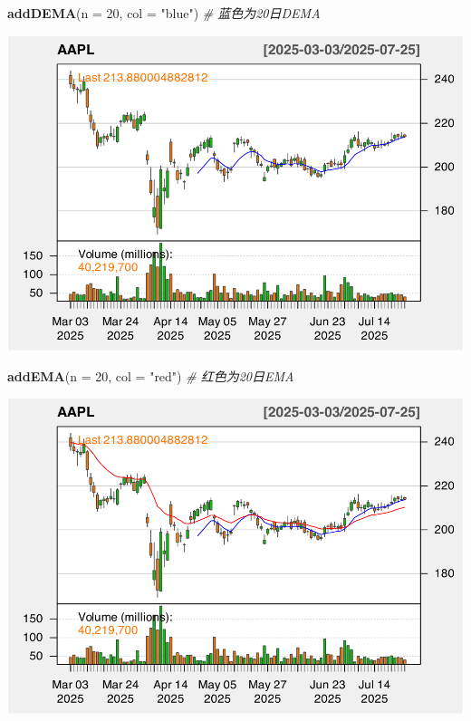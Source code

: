 \documentclass[]{ctexbook}
\newenvironment{Shaded}{\begin{snugshade}}{\end{snugshade}}
\newcommand{\AttributeTok}[1]{\textcolor[rgb]{0.13,0.29,0.53}{#1}}
\newcommand{\CommentTok}[1]{\textcolor[rgb]{0.56,0.35,0.01}{\textit{#1}}}
\newcommand{\DecValTok}[1]{\textcolor[rgb]{0.00,0.00,0.81}{#1}}
\newcommand{\FunctionTok}[1]{\textcolor[rgb]{0.13,0.29,0.53}{\textbf{#1}}}
\newcommand{\NormalTok}[1]{#1}
\newcommand{\StringTok}[1]{\textcolor[rgb]{0.31,0.60,0.02}{#1}}
\begin{document}
\begin{Shaded}
\begin{Highlighting}[]
\FunctionTok{addDEMA}\NormalTok{(}\AttributeTok{n =} \DecValTok{20}\NormalTok{, }\AttributeTok{col =} \StringTok{"blue"}\NormalTok{)    }\CommentTok{\# 蓝色为20日DEMA}
\end{Highlighting}
\end{Shaded}

\includegraphics[width=0.9\linewidth]{QuantmodHandbook_files/figure-latex/dema-2}

\begin{Shaded}
\begin{Highlighting}[]
\FunctionTok{addEMA}\NormalTok{(}\AttributeTok{n =} \DecValTok{20}\NormalTok{, }\AttributeTok{col =} \StringTok{"red"}\NormalTok{)      }\CommentTok{\# 红色为20日EMA}
\end{Highlighting}
\end{Shaded}

\includegraphics[width=0.9\linewidth]{QuantmodHandbook_files/figure-latex/dema-3}
\end{document}
